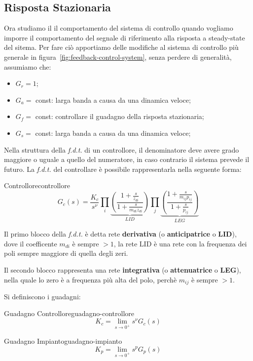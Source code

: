 \documentclass[12pt]{article}
\begin{document}
\subsection{Risposta Stazionaria}
Ora studiamo il il comportamento del sistema di controllo quando vogliamo imporre il comportamento del segnale di riferimento alla risposta a steady-state del sitema. Per fare ci\`o apportiamo delle modifiche al sistema di controllo pi\`u generale in figura~\autoref{fig:feedback-control-system}, senza perdere di generalit\`a, assumiamo che:
\begin{itemize}
    \item $G_r = 1$;
    \item $G_a =$ const: larga banda a causa da una dinamica veloce;
    \item $G_f =$ const: controllare il guadagno della risposta stazionaria;
    \item $G_s = $ const: larga banda a causa da una dinamica veloce;
\end{itemize}

Nella struttura della \emph{f.d.t.} di un controllore, il denominatore deve avere grado maggiore o uguale a quello del numeratore, in caso contrario il sistema prevede il futuro. La \emph{f.d.t.} del controllare \`e possibile rappresentarla nella seguente forma:
\begin{definition}{Controllore}{controllore}
\[ G_c (s) = \frac{K_c}{s^{\nu}} \prod_{i}^{}   \underbrace{\left( \frac{1 + \frac{s}{z _{di}} }{1 + \frac{s}{m _{di} z _{di}} }   \right)}_{LID} \prod_{j}^{}   \underbrace{\left( \frac{ 1 + \frac{s}{m _{ij} p _{ij}} }{ 1 + \frac{s}{p _{ij}} }  \right)}_{LEG} \]
\end{definition}

Il primo blocco della \emph{f.d.t.} \`e detta rete \textbf{derivativa} (o \textbf{anticipatrice} o \textbf{LID}), dove il coefficente $m _{di}$ \`e sempre $> 1$, la rete LID \`e una rete con la frequenza dei poli sempre maggiore di quella degli zeri.

Il secondo blocco rappresenta una rete \textbf{integrativa} (o \textbf{attenuatrice} o \textbf{LEG}), nella quale lo zero \`e a frequenza pi\`u alta del polo, perch\`e $m _{ij}$ \`e sempre $> 1$.

Si definiscono i guadagni:
\begin{definition}{Guadagno Controllore}{guadagno-controllore}
\[ K_c = \lim_{s \to 0^{+}}  s^{\nu} G_c(s) \]
\end{definition}
\begin{definition}{Guadagno Impianto}{guadagno-impianto}
\[ K_p = \lim_{s \to 0^{+}} s^{p}G_p(s)\]
\end{definition}
\end{document}
